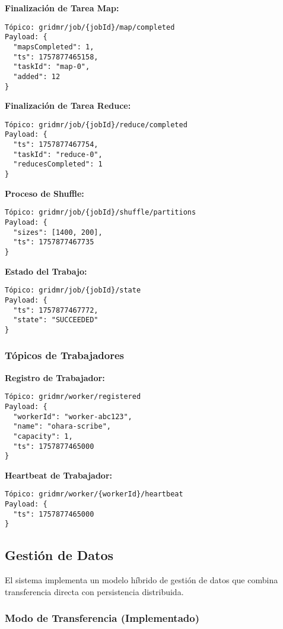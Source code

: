 \textbf{Finalización de Tarea Map:}
\begin{verbatim}
Tópico: gridmr/job/{jobId}/map/completed
Payload: {
  "mapsCompleted": 1,
  "ts": 1757877465158,
  "taskId": "map-0",
  "added": 12
}
\end{verbatim}

\textbf{Finalización de Tarea Reduce:}
\begin{verbatim}
Tópico: gridmr/job/{jobId}/reduce/completed
Payload: {
  "ts": 1757877467754,
  "taskId": "reduce-0",
  "reducesCompleted": 1
}
\end{verbatim}

\textbf{Proceso de Shuffle:}
\begin{verbatim}
Tópico: gridmr/job/{jobId}/shuffle/partitions
Payload: {
  "sizes": [1400, 200],
  "ts": 1757877467735
}
\end{verbatim}

\textbf{Estado del Trabajo:}
\begin{verbatim}
Tópico: gridmr/job/{jobId}/state
Payload: {
  "ts": 1757877467772,
  "state": "SUCCEEDED"
}
\end{verbatim}

\subsubsection{Tópicos de Trabajadores}

\textbf{Registro de Trabajador:}
\begin{verbatim}
Tópico: gridmr/worker/registered
Payload: {
  "workerId": "worker-abc123",
  "name": "ohara-scribe",
  "capacity": 1,
  "ts": 1757877465000
}
\end{verbatim}

\textbf{Heartbeat de Trabajador:}
\begin{verbatim}
Tópico: gridmr/worker/{workerId}/heartbeat
Payload: {
  "ts": 1757877465000
}
\end{verbatim}

\subsection{Gestión de Datos}

El sistema implementa un modelo híbrido de gestión de datos que combina transferencia directa con persistencia distribuida.

\subsubsection{Modo de Transferencia (Implementado)}

